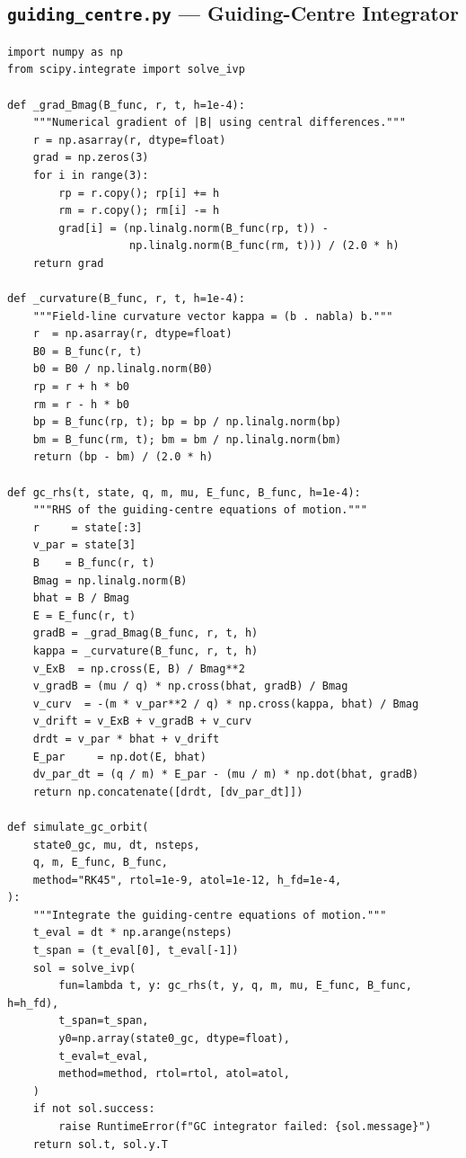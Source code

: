 \subsection{\texttt{guiding\_centre.py} --- Guiding-Centre Integrator}
\begin{verbatim}
import numpy as np
from scipy.integrate import solve_ivp

def _grad_Bmag(B_func, r, t, h=1e-4):
    """Numerical gradient of |B| using central differences."""
    r = np.asarray(r, dtype=float)
    grad = np.zeros(3)
    for i in range(3):
        rp = r.copy(); rp[i] += h
        rm = r.copy(); rm[i] -= h
        grad[i] = (np.linalg.norm(B_func(rp, t)) -
                   np.linalg.norm(B_func(rm, t))) / (2.0 * h)
    return grad

def _curvature(B_func, r, t, h=1e-4):
    """Field-line curvature vector kappa = (b . nabla) b."""
    r  = np.asarray(r, dtype=float)
    B0 = B_func(r, t)
    b0 = B0 / np.linalg.norm(B0)
    rp = r + h * b0
    rm = r - h * b0
    bp = B_func(rp, t); bp = bp / np.linalg.norm(bp)
    bm = B_func(rm, t); bm = bm / np.linalg.norm(bm)
    return (bp - bm) / (2.0 * h)

def gc_rhs(t, state, q, m, mu, E_func, B_func, h=1e-4):
    """RHS of the guiding-centre equations of motion."""
    r     = state[:3]
    v_par = state[3]
    B    = B_func(r, t)
    Bmag = np.linalg.norm(B)
    bhat = B / Bmag
    E = E_func(r, t)
    gradB = _grad_Bmag(B_func, r, t, h)
    kappa = _curvature(B_func, r, t, h)
    v_ExB  = np.cross(E, B) / Bmag**2
    v_gradB = (mu / q) * np.cross(bhat, gradB) / Bmag
    v_curv  = -(m * v_par**2 / q) * np.cross(kappa, bhat) / Bmag
    v_drift = v_ExB + v_gradB + v_curv
    drdt = v_par * bhat + v_drift
    E_par     = np.dot(E, bhat)
    dv_par_dt = (q / m) * E_par - (mu / m) * np.dot(bhat, gradB)
    return np.concatenate([drdt, [dv_par_dt]])

def simulate_gc_orbit(
    state0_gc, mu, dt, nsteps,
    q, m, E_func, B_func,
    method="RK45", rtol=1e-9, atol=1e-12, h_fd=1e-4,
):
    """Integrate the guiding-centre equations of motion."""
    t_eval = dt * np.arange(nsteps)
    t_span = (t_eval[0], t_eval[-1])
    sol = solve_ivp(
        fun=lambda t, y: gc_rhs(t, y, q, m, mu, E_func, B_func, h=h_fd),
        t_span=t_span,
        y0=np.array(state0_gc, dtype=float),
        t_eval=t_eval,
        method=method, rtol=rtol, atol=atol,
    )
    if not sol.success:
        raise RuntimeError(f"GC integrator failed: {sol.message}")
    return sol.t, sol.y.T
\end{verbatim}

